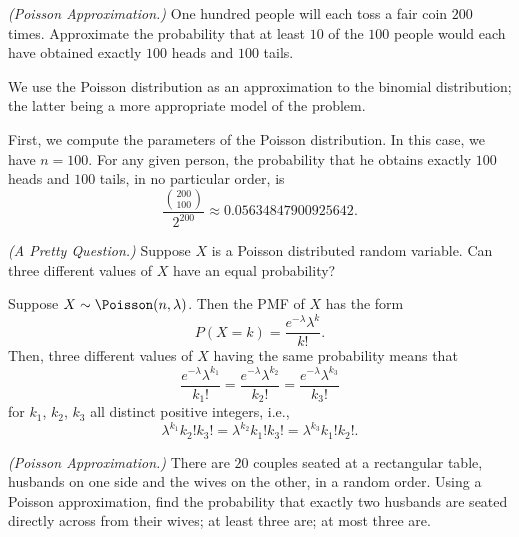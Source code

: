 \begin{problem}[Handout 10, \# 4]
  \emph{(Poisson Approximation.)} One hundred people will each toss a fair
  coin \(200\) times. Approximate the probability that at least \(10\) of
  the \(100\) people would each have obtained exactly \(100\) heads and
  \(100\) tails.
\end{problem}
\begin{solution}
  We use the Poisson distribution as an approximation to the binomial
  distribution; the latter being a more appropriate model of the problem.

  First, we compute the parameters of the Poisson distribution. In this
  case, we have \(n=100\). For any given person, the probability that he
  obtains exactly \(100\) heads and \(100\) tails, in no particular order,
  is
  \[
    \frac{\binom{200}{100}}{2^{200}}\approx\num{0.05634847900925642}.
  \]
\end{solution}
\newpage

\begin{problem}[Handout 10, \# 5]
  \emph{(A Pretty Question.)} Suppose \(X\) is a Poisson distributed random
  variable. Can three different values of \(X\) have an equal probability?
\end{problem}
\begin{solution}
  Suppose \(X\sim\Poisson(n,\lambda)\). Then the PMF of \(X\) has the form
  \[
    P(X=k)=\frac{e^{-\lambda}\lambda^k}{k!}.
  \]
  Then, three different values of \(X\) having the same probability means
  that
  \[
    \frac{e^{-\lambda}\lambda^{k_1}}{k_1!}
    =
    \frac{e^{-\lambda}\lambda^{k_2}}{k_2!}
    =
    \frac{e^{-\lambda}\lambda^{k_3}}{k_3!}
  \]
  for \(k_1\), \(k_2\), \(k_3\) all distinct positive integers, i.e.,
  \[
    \lambda^{k_1}k_2!k_3!
    =
    \lambda^{k_2}k_1!k_3!
    =
    \lambda^{k_3}k_1!k_2!.
  \]
\end{solution}
\newpage

\begin{problem}[Handout 10, \# 6]
  \emph{(Poisson Approximation.)} There are \(20\) couples seated at a
  rectangular table, husbands on one side and the wives on the other, in a
  random order. Using a Poisson approximation, find the probability that
  exactly two husbands are seated directly across from their wives; at
  least three are; at most three are.
\end{problem}
\begin{solution}

\end{solution}
\newpage

